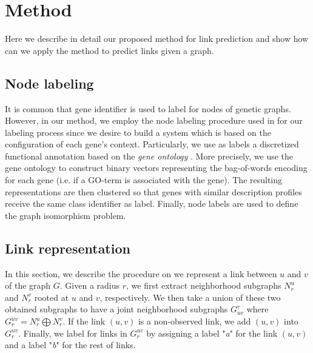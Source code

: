 \documentclass{article}
\begin{document}
\section{Method}
\label{method}
Here we describe in detail our proposed method for link prediction and show how can we apply the method to predict links given a graph.
\subsection{Node labeling}
It is common that gene identifier is used to label for nodes of genetic graphs. However, in our method, we employ the node labeling procedure used in \cite{cdnk} for our labeling process since we desire to build a system which is based on the configuration of each gene's context. Particularly, we use as labels a discretized functional annotation based on the \textit{gene ontology} \cite{ontology}. More precisely,  we use the gene ontology to construct binary vectors representing the bag-of-words encoding for each gene (i.e. if a GO-term is associated with the gene). The resulting representations are then clustered so that genes with similar description profiles receive the same class identifier as label. Finally, node labels are used to define the graph isomorphism problem.
\subsection{Link representation}
In this section, we describe the procedure on we represent a link between $u$ and $v$ of the graph $G$. Given a radius $r$, we first extract neighborhood subgraphs $N_{r}^u$ and $N_{r}^v$ rooted at $u$ and $v$, respectively. We then take a union of these two obtained subgraphs to have a joint neighborhood subgraphs $G_{uv}^r$ where $G_{r}^{uv} = N_{r}^u \bigoplus N_{r}^v$. If the link $(u,v)$ is a non-observed link, we add $(u,v)$ into $G_{r}^{uv}$. Finally, we label for links in $G_{r}^{uv}$ by assigning a label "\textit{a}" for the link $(u,v)$ and a label "\textit{b}" for the rest of links.
\end{document}

